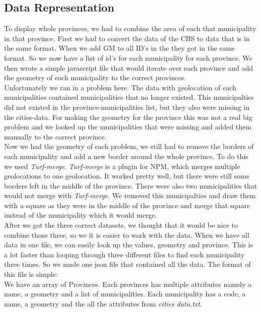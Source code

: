 \subsection{Data Representation}
To display whole provinces, we had to combine the area of each that municipality in that province. First we had to convert the data of the CBS to data that is in the same format. When we add GM to all ID's in the they got in the same format. So we now have a list of id's for each municipality for each province. We then wrote a simple javascript file that would iterate over each province and add the geometry of each municipality to the correct provinces. \\
Unfortunately we ran in a problem here. The data with geolocation of each municipalities contained municipalities that no longer existed. This municipalties did not existed in the province-municipalities list, but they also were missing in the cities-data. For making the geometry for the province this was not a real big problem and we looked up the municipalities that were missing and added them manually to the correct province. \\
Now we had the geometry of each problem, we still had to remove the borders of each municipality and add a new border around the whole province. To do this we used \emph{Turf-merge}.  \emph{Turf-merge} is a plugin for NPM, which merges multiple geolocations to one geolocation. It worked pretty well, but there were still some borders left in the middle of the province. There were also two municipalities that would not merge with \emph{Turf-merge}. We removed this municipalties and draw them with a square as they were in the middle of the province and merge that square instead of the municipality which it would merge. \\
After we got the three correct datasets, we thought that it would be nice to combine those three, so we it is easier to work with the data. When we have all data in one file, we can easily look up the values, geometry and province. This is a lot faster than looping through three different files to find each municipality three times. So we made one json file that contained all the data. The format of this file is simple: \\
We have an array of Provinces. Each provinces has multiple attributes namely a name, a geometry and a list of municipalities. Each municipality has a code, a name, a geometry and the all the attributes from \emph{ cities data.txt}.
